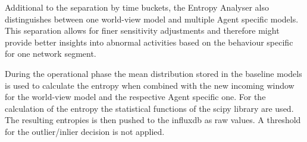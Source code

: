 Additional to the separation by time buckets, the Entropy Analyser also distinguishes between one world-view model and multiple Agent specific models. This separation allows for finer sensitivity adjustments and therefore might provide better insights into abnormal activities based on the behaviour specific for one network segment.

During the operational phase the mean distribution stored in the baseline models is used to calculate the entropy when combined with the new incoming window for the world-view model and the respective Agent specific one.
For the calculation of the entropy the statistical functions of the \gls{scipy} library are used.
The resulting entropies is then pushed to the \gls{influxdb} as raw values. A threshold for the outlier/inlier decision is not applied.
